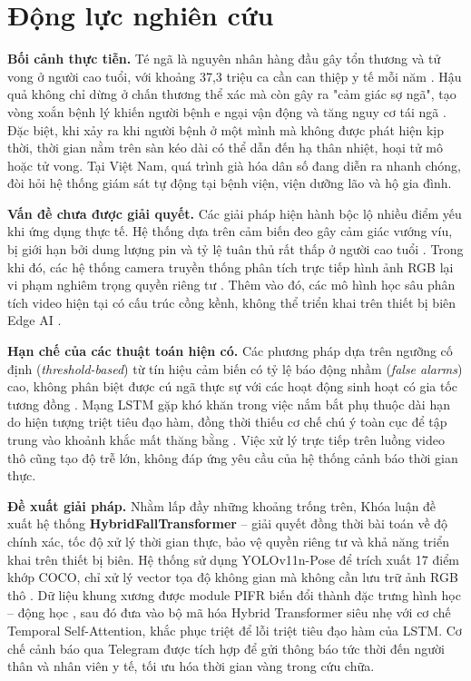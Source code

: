 \section{Động lực nghiên cứu}
\label{sec:dong_luc_nghien_cuu}

\noindent\textbf{Bối cảnh thực tiễn.} Té ngã là nguyên nhân hàng đầu gây tổn thương và tử vong ở người cao tuổi, với khoảng 37,3 triệu ca cần can thiệp y tế mỗi năm \cite{who2021falls}. Hậu quả không chỉ dừng ở chấn thương thể xác mà còn gây ra "cảm giác sợ ngã", tạo vòng xoắn bệnh lý khiến người bệnh e ngại vận động và tăng nguy cơ tái ngã \cite{dao2022thuongtich}. Đặc biệt, khi xảy ra khi người bệnh ở một mình mà không được phát hiện kịp thời, thời gian nằm trên sàn kéo dài có thể dẫn đến hạ thân nhiệt, hoại tử mô hoặc tử vong. Tại Việt Nam, quá trình già hóa dân số đang diễn ra nhanh chóng, đòi hỏi hệ thống giám sát tự động tại bệnh viện, viện dưỡng lão và hộ gia đình.

\noindent\textbf{Vấn đề chưa được giải quyết.} Các giải pháp hiện hành bộc lộ nhiều điểm yếu khi ứng dụng thực tế. Hệ thống dựa trên cảm biến đeo gây cảm giác vướng víu, bị giới hạn bởi dung lượng pin và tỷ lệ tuân thủ rất thấp ở người cao tuổi \cite{pham2025lightweight, khawam2025fall}. Trong khi đó, các hệ thống camera truyền thống phân tích trực tiếp hình ảnh RGB lại vi phạm nghiêm trọng quyền riêng tư \cite{ursul2024dynamic}. Thêm vào đó, các mô hình học sâu phân tích video hiện tại có cấu trúc cồng kềnh, không thể triển khai trên thiết bị biên Edge AI \cite{kurniadi2026human}.

\noindent\textbf{Hạn chế của các thuật toán hiện có.} Các phương pháp dựa trên ngưỡng cố định (\textit{threshold-based}) từ tín hiệu cảm biến có tỷ lệ báo động nhầm (\textit{false alarms}) cao, không phân biệt được cú ngã thực sự với các hoạt động sinh hoạt có gia tốc tương đồng \cite{benabdennour2026real}. Mạng LSTM gặp khó khăn trong việc nắm bắt phụ thuộc dài hạn do hiện tượng triệt tiêu đạo hàm, đồng thời thiếu cơ chế chú ý toàn cục để tập trung vào khoảnh khắc mất thăng bằng \cite{benabdennour2026real}. Việc xử lý trực tiếp trên luồng video thô cũng tạo độ trễ lớn, không đáp ứng yêu cầu của hệ thống cảnh báo thời gian thực.

\noindent\textbf{Đề xuất giải pháp.} Nhằm lấp đầy những khoảng trống trên, Khóa luận đề xuất hệ thống \textbf{HybridFallTransformer} -- giải quyết đồng thời bài toán về độ chính xác, tốc độ xử lý thời gian thực, bảo vệ quyền riêng tư và khả năng triển khai trên thiết bị biên. Hệ thống sử dụng YOLOv11n-Pose để trích xuất 17 điểm khớp COCO, chỉ xử lý vector tọa độ không gian mà không cần lưu trữ ảnh RGB thô \cite{khanam2024yolov11}. Dữ liệu khung xương được module PIFR biến đổi thành đặc trưng hình học -- động học \cite{kong2025pifr}, sau đó đưa vào bộ mã hóa Hybrid Transformer siêu nhẹ với cơ chế Temporal Self-Attention, khắc phục triệt để lỗi triệt tiêu đạo hàm của LSTM. Cơ chế cảnh báo qua Telegram được tích hợp để gửi thông báo tức thời đến người thân và nhân viên y tế, tối ưu hóa thời gian vàng trong cứu chữa.
